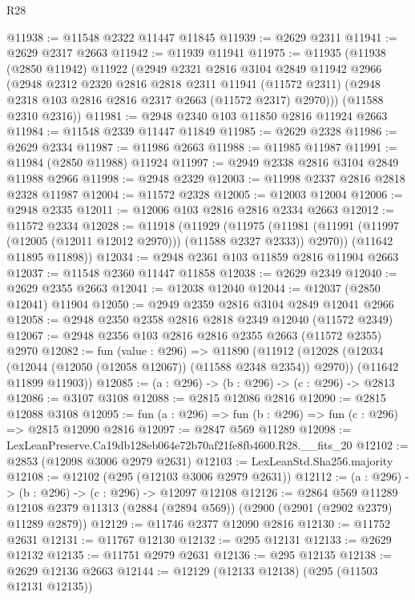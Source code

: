 \begin{lexlean}{R28}
\begin{coremodule}
@11938 := @11548 @2322 @11447 @11845
@11939 := @2629 @2311
@11941 := @2629 @2317 @2663
@11942 := @11939 @11941
@11975 := @11935
    (@11938
      (@2850 @11942)
      @11922
      (@2949
        @2321
        @2816
        @3104
        @2849
        @11942
        @2966
        (@2948
          @2312
          @2320
          @2816
          @2818
          @2311
          @11941
          (@11572 @2311)
          (@2948 @2318 @103 @2816 @2816 @2317 @2663 (@11572 @2317) @2970)))
      (@11588 @2310 @2316))
@11981 := @2948 @2340 @103 @11850 @2816 @11924 @2663
@11984 := @11548 @2339 @11447 @11849
@11985 := @2629 @2328
@11986 := @2629 @2334
@11987 := @11986 @2663
@11988 := @11985 @11987
@11991 := @11984 (@2850 @11988) @11924
@11997 := @2949 @2338 @2816 @3104 @2849 @11988 @2966
@11998 := @2948 @2329
@12003 := @11998 @2337 @2816 @2818 @2328 @11987
@12004 := @11572 @2328
@12005 := @12003 @12004
@12006 := @2948 @2335
@12011 := @12006 @103 @2816 @2816 @2334 @2663
@12012 := @11572 @2334
@12028 := @11918
    (@11929
      (@11975 (@11981 (@11991 (@11997 (@12005 (@12011 @12012 @2970))) (@11588 @2327 @2333)) @2970))
      (@11642 @11895 @11898))
@12034 := @2948 @2361 @103 @11859 @2816 @11904 @2663
@12037 := @11548 @2360 @11447 @11858
@12038 := @2629 @2349
@12040 := @2629 @2355 @2663
@12041 := @12038 @12040
@12044 := @12037 (@2850 @12041) @11904
@12050 := @2949 @2359 @2816 @3104 @2849 @12041 @2966
@12058 := @2948 @2350 @2358 @2816 @2818 @2349 @12040 (@11572 @2349)
@12067 := @2948 @2356 @103 @2816 @2816 @2355 @2663 (@11572 @2355) @2970
@12082 := fun (value : @296) =>
  @11890
    (@11912
      (@12028 (@12034 (@12044 (@12050 (@12058 @12067)) (@11588 @2348 @2354)) @2970))
      (@11642 @11899 @11903))
@12085 := (a : @296) -> (b : @296) -> (c : @296) -> @2813
@12086 := @3107 @3108
@12088 := @2815 @12086 @2816
@12090 := @2815 @12088 @3108
@12095 := fun (a : @296) => fun (b : @296) => fun (c : @296) => @2815 @12090 @2816
@12097 := @2847 @569 @11289
@12098 := LexLeanPreserve.Ca19db128eb064e72b70af21fe8fb4600.R28.__fits_20
@12102 := @2853 (@12098 @3006 @2979 @2631)
@12103 := LexLeanStd.Sha256.majority
@12108 := @12102 (@295 (@12103 @3006 @2979 @2631))
@12112 := (a : @296) -> (b : @296) -> (c : @296) -> @12097 @12108
@12126 := @2864
    @569
    @11289
    @12108
    @2379
    @11313
    (@2884 (@2894 @569))
    (@2900 (@2901 (@2902 @2379) @11289 @2879))
@12129 := @11746 @2377 @12090 @2816
@12130 := @11752 @2631
@12131 := @11767 @12130
@12132 := @295 @12131
@12133 := @2629 @12132
@12135 := @11751 @2979 @2631
@12136 := @295 @12135
@12138 := @2629 @12136 @2663
@12144 := @12129 (@12133 @12138) (@295 (@11503 @12131 @12135))

\end{coremodule}
\end{lexlean}
